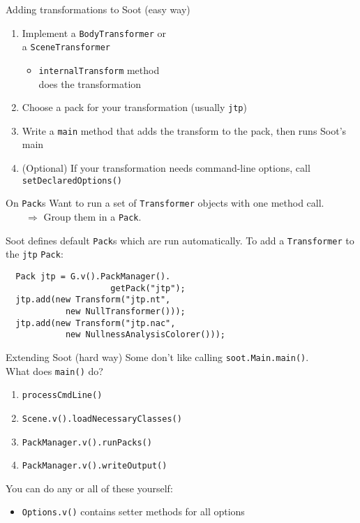 \begin{slide}{Adding transformations to Soot (easy way)}
\vspace*{-0.1in}
\begin{enumerate}
\item Implement a \texttt{BodyTransformer} or\\ a \texttt{SceneTransformer}
\begin{itemize}
\item \texttt{internalTransform} method \\does the transformation
\end{itemize}
\item Choose a pack for your transformation (usually \texttt{jtp})
\item Write a \texttt{main} method that adds the transform to the pack, then
runs Soot's main
\item (Optional) If your transformation needs command-line options,
call \texttt{setDeclaredOptions()}
\end{enumerate}
\end{slide}

\begin{slide}{On {\tt Pack}s}
\vspace*{-0.2in}
Want to run a set of {\tt Transformer} objects with one method call.\\
$\qquad \Rightarrow$ Group them in a {\tt Pack}.

\vspace{0.1in}
Soot defines default {\tt Pack}s which are run automatically.
To add a {\tt Transformer} to the {\tt jtp} {\tt Pack}:
{\small
\begin{verbatim}
  Pack jtp = G.v().PackManager().
                     getPack("jtp");
  jtp.add(new Transform("jtp.nt", 
            new NullTransformer()));
  jtp.add(new Transform("jtp.nac", 
            new NullnessAnalysisColorer()));
\end{verbatim}}
\end{slide}

\begin{slide}{Extending Soot (hard way)}
Some don't like calling {\texttt{soot.Main.main()}}.\\
What does \texttt{main()} do?
\begin{enumerate}
\item \texttt{processCmdLine()}
\item \texttt{Scene.v().loadNecessaryClasses()}
\item \texttt{PackManager.v().runPacks()}
\item \texttt{PackManager.v().writeOutput()}
\end{enumerate}
You can do any or all of these yourself:
\begin{itemize}
\item \texttt{Options.v()} contains setter methods for all options
\end{itemize}
\end{slide}


